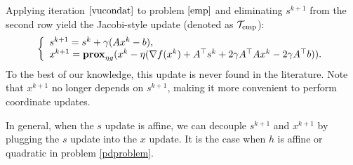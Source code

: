 {{%
Applying iteration $\eqref{vucondat}$ to problem $\eqref{emp}$ and eliminating $s^{k+1}$ from the second row yield the Jacobi-style update (denoted as ${\mathcal{T}}_\textnormal{emp}$):
\begin{equation}
\left\{
\begin{array}{l}
s^{k+1}=s^k+\gamma (Ax^k-b),\\
x^{k+1}=\prox_{\eta g}(x^k-\eta(\nabla f(x^k)+A^\top s^k+2\gamma A^\top Ax^k-2\gamma A^\top b)).
\end{array}
\right.\label{pdemp}
\end{equation}
To the best of our knowledge, this update is never found in the literature. Note that $x^{k+1}$ no longer depends on $s^{k+1}$, making it more convenient to perform coordinate updates.
%
\begin{remark}
In general, when the $s$ update is affine, we can decouple $s^{k+1}$ and $x^{k+1}$ by plugging the $s$ update into the $x$ update. It is the case when $h$ is affine or quadratic in problem \eqref{pdproblem}.

\end{remark}}}
